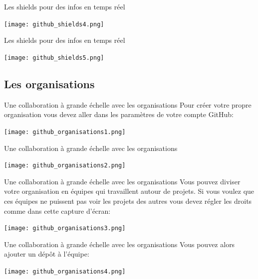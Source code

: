 \documentclass{beamer}
\begin{document}
\begin{frame}{Les shields pour des infos en temps réel}
\begin{center}
	\texttt{[image: github\_shields4.png]}
\end{center}
\end{frame}

\begin{frame}{Les shields pour des infos en temps réel}
\begin{center}
	\texttt{[image: github\_shields5.png]}
\end{center}
\end{frame}



\subsection{Les organisations}
\begin{frame}{Une collaboration à grande échelle avec les organisations}
Pour créer votre propre organisation vous devez aller dans les paramètres de votre compte GitHub:
\medskip
\begin{center}
	\texttt{[image: github\_organisations1.png]}
\end{center}
\end{frame}

\begin{frame}{Une collaboration à grande échelle avec les organisations}
\begin{center}
	\texttt{[image: github\_organisations2.png]}
\end{center}
\end{frame}

\begin{frame}{Une collaboration à grande échelle avec les organisations}
Vous pouvez diviser votre organisation en équipes qui travaillent autour de projets. Si vous voulez que ces équipes ne puissent pas voir les projets des autres vous devez régler les droits comme dans cette capture d'écran:
\medskip
\begin{center}
	\texttt{[image: github\_organisations3.png]}
\end{center}
\end{frame}

\begin{frame}{Une collaboration à grande échelle avec les organisations}
Vous pouvez alors ajouter un dépôt à l'équipe:
\medskip
\begin{center}
	\texttt{[image: github\_organisations4.png]}
\end{center}
\end{frame}
\end{document}
